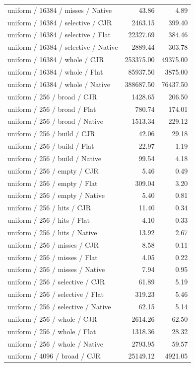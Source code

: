 \begin{longtable}{p{}rr}
uniform / 16384 / misses / Native & 43.86 & 4.89 \\
uniform / 16384 / selective / CJR & 2463.15 & 399.40 \\
uniform / 16384 / selective / Flat & 22327.69 & 384.46 \\
uniform / 16384 / selective / Native & 2889.44 & 303.78 \\
uniform / 16384 / whole / CJR & 253375.00 & 49375.00 \\
uniform / 16384 / whole / Flat & 85937.50 & 3875.00 \\
uniform / 16384 / whole / Native & 388687.50 & 76437.50 \\
uniform / 256 / broad / CJR & 1428.65 & 206.50 \\
uniform / 256 / broad / Flat & 780.74 & 174.01 \\
uniform / 256 / broad / Native & 1513.34 & 229.12 \\
uniform / 256 / build / CJR & 42.06 & 29.18 \\
uniform / 256 / build / Flat & 22.97 & 1.19 \\
uniform / 256 / build / Native & 99.54 & 4.18 \\
uniform / 256 / empty / CJR & 5.46 & 0.49 \\
uniform / 256 / empty / Flat & 309.04 & 3.20 \\
uniform / 256 / empty / Native & 5.40 & 0.81 \\
uniform / 256 / hits / CJR & 11.40 & 0.34 \\
uniform / 256 / hits / Flat & 4.10 & 0.33 \\
uniform / 256 / hits / Native & 13.92 & 2.67 \\
uniform / 256 / misses / CJR & 8.58 & 0.11 \\
uniform / 256 / misses / Flat & 4.05 & 0.22 \\
uniform / 256 / misses / Native & 7.94 & 0.95 \\
uniform / 256 / selective / CJR & 61.89 & 5.19 \\
uniform / 256 / selective / Flat & 319.23 & 5.46 \\
uniform / 256 / selective / Native & 62.15 & 5.14 \\
uniform / 256 / whole / CJR & 2614.26 & 62.50 \\
uniform / 256 / whole / Flat & 1318.36 & 28.32 \\
uniform / 256 / whole / Native & 2793.95 & 59.57 \\
uniform / 4096 / broad / CJR & 25149.12 & 4921.05 \\

\end{longtable}
